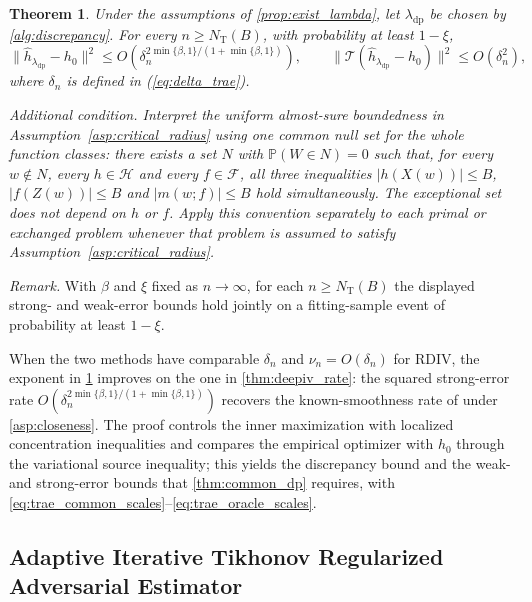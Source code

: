 \documentclass[12pt]{article}
\theoremstyle{plain}
\newtheorem{theorem}{Theorem}[section]
\theoremstyle{definition}
\theoremstyle{remark}
\begin{document}
\begin{theorem}\label{thm:tikhonv_rate}
Under the assumptions of \cref{prop:exist_lambda}, let $ {\lambda_{\mathrm{dp}}} $ be chosen by \cref{alg:discrepancy}. For every $n\geqslant N_{\mathrm T}(B)$, with probability at least $ 1-\xi $, 
\[
\| \hat{h}_{\lambda_{\mathrm{dp}}} -h_{0} \| ^{2} \leqslant O\left( \delta _{n}^{2\min\{\beta ,1\} /( 1+\min\{\beta ,1\})}\right) ,\qquad
\| \mathcal{T}(\hat{h}_{\lambda_{\mathrm{dp}}} -h_{0}) \| ^{2} \leqslant O\left( \delta _{n}^{2}\right) ,
\]
where $\delta_n$ is defined in (\ref{eq:delta_trae}).

\emph{Additional condition.} Interpret the uniform almost-sure boundedness in Assumption~\ref{asp:critical_radius} using one common null set for the whole function classes: there exists a set $N$ with $\mathbb P(W\in N)=0$ such that, for every $w\notin N$, every $h\in\mathcal H$ and every $f\in\mathcal F$, all three inequalities $|h(X(w))|\leqslant B$, $|f(Z(w))|\leqslant B$ and $|m(w;f)|\leqslant B$ hold simultaneously. The exceptional set does not depend on $h$ or $f$. Apply this convention separately to each primal or exchanged problem whenever that problem is assumed to satisfy Assumption~\ref{asp:critical_radius}.
\end{theorem}

\noindent\textit{Remark.} With $\beta$ and $\xi$ fixed as $n\to\infty$, for each $n\geqslant N_{\mathrm T}(B)$ the displayed strong- and weak-error bounds hold jointly on a fitting-sample event of probability at least $1-\xi$.


When the two methods have comparable $\delta_n$ and $\nu_n=O(\delta_n)$ for RDIV, the exponent in \cref{thm:tikhonv_rate} improves on the one in \cref{thm:deepiv_rate}: the squared strong-error rate $O(\delta_{n}^{2\min\{\beta,1\}/(1+\min\{\beta,1\})})$ recovers the known-smoothness rate of \citet{bennett2023source} under \cref{asp:closeness}. The proof controls the inner maximization with localized concentration inequalities and compares the empirical optimizer with $h_0$ through the variational source inequality; this yields the discrepancy bound and the weak- and strong-error bounds that \cref{thm:common_dp} requires, with \eqref{eq:trae_common_scales}--\eqref{eq:trae_oracle_scales}.

\subsection{Adaptive Iterative Tikhonov Regularized Adversarial Estimator}
\end{document}
